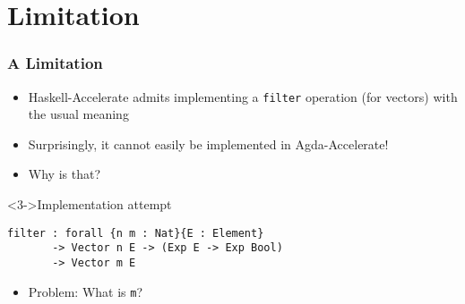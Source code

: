 \documentclass{beamer}
\begin{document}
\section{Limitation}

\begin{frame}[fragile]
  \frametitle{A Limitation}
  \begin{itemize}
  \item Haskell-Accelerate admits implementing a \texttt{filter}
    operation (for vectors) with the usual meaning
  \item<2-> Surprisingly, it cannot easily be implemented in Agda-Accelerate!
  \item<2-> Why is that?
  \end{itemize}
  \begin{block}<3->{Implementation attempt}
\begin{verbatim}
filter : forall {n m : Nat}{E : Element}
       -> Vector n E -> (Exp E -> Exp Bool) 
       -> Vector m E
\end{verbatim}
    \begin{itemize}
    \item Problem: What is \texttt{m}?
    \end{itemize}
  \end{block}
\end{frame}
\end{document}
